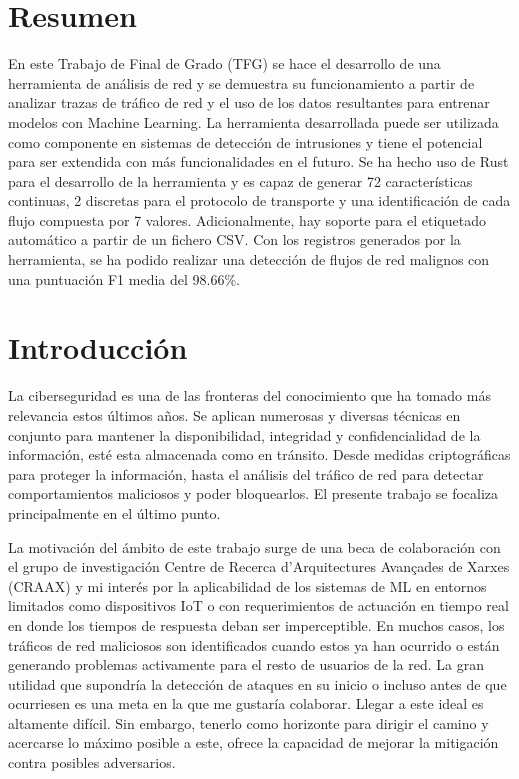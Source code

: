 \documentclass[10pt,a4paper,twoside]{article}
\begin{document}
\begin{multicols*}{2}
    \section*{Resumen}

    En este Trabajo de Final de Grado (TFG) se hace el desarrollo de una herramienta de análisis de red y se demuestra su funcionamiento a partir de analizar trazas de tráfico de red y el uso de los datos resultantes para entrenar modelos con Machine Learning. La herramienta desarrollada puede ser utilizada como componente en sistemas  de detección de intrusiones y tiene el potencial para ser extendida con más funcionalidades en el futuro. Se ha hecho uso de Rust para el desarrollo de la herramienta y es capaz de generar 72 características continuas, 2 discretas para el protocolo de transporte y una identificación de cada flujo compuesta por 7 valores. Adicionalmente, hay soporte para el etiquetado automático a partir de un fichero CSV. Con los registros generados por la herramienta, se ha podido realizar una detección de flujos de red malignos con una puntuación F1 media del 98.66\%.

    \section{Introducción}
    
    La ciberseguridad es una de las fronteras del conocimiento que ha tomado más relevancia estos últimos años. Se aplican numerosas y diversas técnicas en conjunto para mantener la disponibilidad, integridad y confidencialidad de la información, esté esta almacenada como en tránsito. Desde medidas criptográficas para proteger la información, hasta el análisis del tráfico de red para detectar comportamientos maliciosos y poder bloquearlos. El presente trabajo se focaliza principalmente en el último punto.

    La motivación del ámbito de este trabajo surge de una beca de colaboración con el grupo de investigación Centre de Recerca d'Arquitectures Avançades de Xarxes (CRAAX) y mi interés por la aplicabilidad de los sistemas de ML en entornos limitados como dispositivos IoT o con requerimientos de actuación en tiempo real en donde los tiempos de respuesta deban ser imperceptible. En muchos casos, los tráficos de red maliciosos son identificados cuando estos ya han ocurrido o están generando problemas activamente para el resto de usuarios de la red. La gran utilidad que supondría la detección de ataques en su inicio o incluso antes de que ocurriesen es una meta en la que me gustaría colaborar. Llegar a este ideal es altamente difícil. Sin embargo, tenerlo como horizonte para dirigir el camino y acercarse lo máximo posible a este, ofrece la capacidad de mejorar la mitigación contra posibles adversarios.


\end{multicols*}
\end{document}
